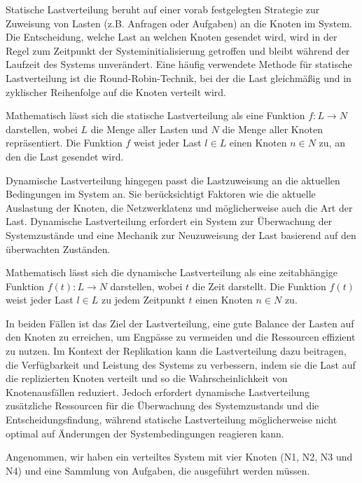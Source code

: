\documentclass[../vs-script-first-v01.tex]{subfiles}
\begin{document}
Statische Lastverteilung beruht auf einer vorab festgelegten Strategie zur Zuweisung von Lasten (z.B. Anfragen oder Aufgaben) an die Knoten im System. Die Entscheidung, welche Last an welchen Knoten gesendet wird, wird in der Regel zum Zeitpunkt der Systeminitialisierung getroffen und bleibt während der Laufzeit des Systems unverändert. Eine häufig verwendete Methode für statische Lastverteilung ist die Round-Robin-Technik, bei der die Last gleichmäßig und in zyklischer Reihenfolge auf die Knoten verteilt wird.

Mathematisch lässt sich die statische Lastverteilung als eine Funktion $f: L \to N$ darstellen, wobei $L$ die Menge aller Lasten und $N$ die Menge aller Knoten repräsentiert. Die Funktion $f$ weist jeder Last $l \in L$ einen Knoten $n \in N$ zu, an den die Last gesendet wird.

Dynamische Lastverteilung hingegen passt die Lastzuweisung an die aktuellen Bedingungen im System an. Sie berücksichtigt Faktoren wie die aktuelle Auslastung der Knoten, die Netzwerklatenz und möglicherweise auch die Art der Last. Dynamische Lastverteilung erfordert ein System zur Überwachung der Systemzustände und eine Mechanik zur Neuzuweisung der Last basierend auf den überwachten Zuständen.

Mathematisch lässt sich die dynamische Lastverteilung als eine zeitabhängige Funktion $f(t): L \to N$ darstellen, wobei $t$ die Zeit darstellt. Die Funktion $f(t)$ weist jeder Last $l \in L$ zu jedem Zeitpunkt $t$ einen Knoten $n \in N$ zu.

In beiden Fällen ist das Ziel der Lastverteilung, eine gute Balance der Lasten auf den Knoten zu erreichen, um Engpässe zu vermeiden und die Ressourcen effizient zu nutzen. Im Kontext der Replikation kann die Lastverteilung dazu beitragen, die Verfügbarkeit und Leistung des Systems zu verbessern, indem sie die Last auf die replizierten Knoten verteilt und so die Wahrscheinlichkeit von Knotenausfällen reduziert. Jedoch erfordert dynamische Lastverteilung zusätzliche Ressourcen für die Überwachung des Systemzustands und die Entscheidungsfindung, während statische Lastverteilung möglicherweise nicht optimal auf Änderungen der Systembedingungen reagieren kann.

Angenommen, wir haben ein verteiltes System mit vier Knoten (N1, N2, N3 und N4) und eine Sammlung von Aufgaben, die ausgeführt werden müssen.
\end{document}

